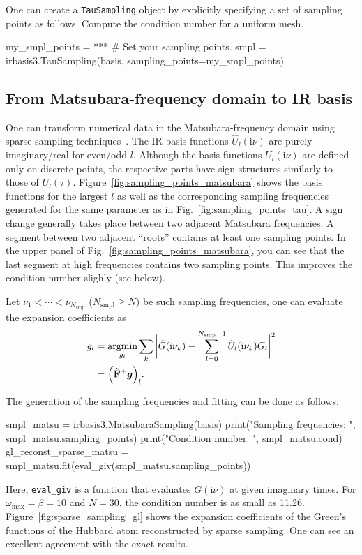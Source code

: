 \documentclass[submission, LectureNotes]{SciPost}
\newcommand{\wmax}{\ensuremath{{\omega_\mathrm{max}}}}
\newcommand\ii{\mathrm{i}}%
\newcommand\iv{\ii\nu}%
\newcommand{\vk}{\ensuremath{\bar{\nu}_k}}
\newcommand{\Fmat}{{\mathbf{F}}}
\begin{document}
\begin{Exercise}
One can create a \texttt{TauSampling} object by explicitly specifying a set of sampling points as follows.
Compute the condition number for a uniform mesh.
\begin{python}
my_smpl_points = *** # Set your sampling points.
smpl = irbasis3.TauSampling(basis, sampling_points=my_smpl_points)
\end{python}
\end{Exercise}

\subsection{From Matsubara-frequency domain to IR basis}
One can transform numerical data in the Matsubara-frequency domain using sparse-sampling techniques~\cite{Li:2020eu}.
The IR basis functions $\hat U_l(\iv)$ are purely imaginary/real for even/odd $l$.
Although the basis functions $U_l(\iv)$ are defined only on discrete points,
the respective parts have sign structures similarly to those of $U_l(\tau)$.
Figure~\ref{fig:sampling_points_matsubara} shows the basis functions for the largest $l$ 
as well as the corresponding sampling frequencies generated for the same parameter as in Fig.~\ref{fig:sampling_points_tau}.
A sign change generally takes place between two adjacent Matsubara frequencies.
A segment between two adjacent ``roots'' contains at least one sampling points.
In the upper panel of Fig.~\ref{fig:sampling_points_matsubara},
you can see that the last segment at high frequencies contains two sampling points.
This improves the condition number slighly (see below).

Let $\bar{\nu}_1 < \cdots < \bar{\nu}_{N_\mathrm{smp}}$ ($N_\mathrm{smpl}\ge N$)
be such sampling frequencies,
one can evaluate the expansion coefficients as
\begin{align}
    g_l &= \underset{g_l}{\mathrm{argmin}}
        \sum_k \bigg| \hat G(\ii\vk) - \sum_{l=0}^{N_\mathrm{smp}-1} \hat{U}_l(\ii\vk)G_l \bigg|^2\nonumber \\
    &= \pqty{\hat{\Fmat}^+ \boldsymbol{g}}_l.\label{eq:fitmatsubara}
\end{align}

The generation of the sampling frequencies and fitting can be done as follows:
\begin{python}
smpl_matsu = irbasis3.MatsubaraSampling(basis)
print("Sampling frequencies: ", smpl_matsu.sampling_points)
print("Condition number: ", smpl_matsu.cond)
gl_reconst_sparse_matsu = smpl_matsu.fit(eval_giv(smpl_matsu.sampling_points))
\end{python}
Here, \texttt{eval\_giv} is a function that evaluates $G(\iv)$ at given imaginary times.
For $\wmax=\beta=10$ and $N=30$, the condition number is as small as 11.26.
Figure~\ref{fig:sparse_sampling_gl} shows the expansion coefficients of the Green's functions of 
the Hubbard atom reconstructed by sparse sampling.
One can see an excellent agreement with the exact results.
\end{document}
